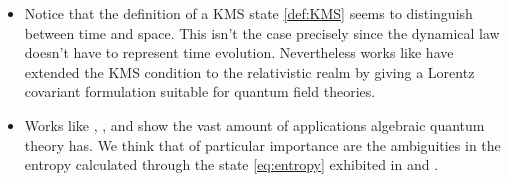 \begin{itemize}
\item Notice that the definition of a KMS state \ref{def:KMS} seems to distinguish between time and space. This isn't the case precisely since the dynamical law doesn't have to represent time evolution. Nevertheless works like \cite{Bros1994} have extended the KMS condition to the relativistic realm by giving a Lorentz covariant formulation suitable for quantum field theories.

\item Works like  \cite{Reyes2013}, \cite{Balachandran2013c}, and \cite{Balachandran2013} show the vast amount of applications algebraic quantum theory has. We think that of particular importance are the ambiguities in the entropy calculated through the state \ref{eq:entropy} exhibited in \cite{Balachandran2013b} and \cite{Balachandran2013a}.

\end{itemize}

